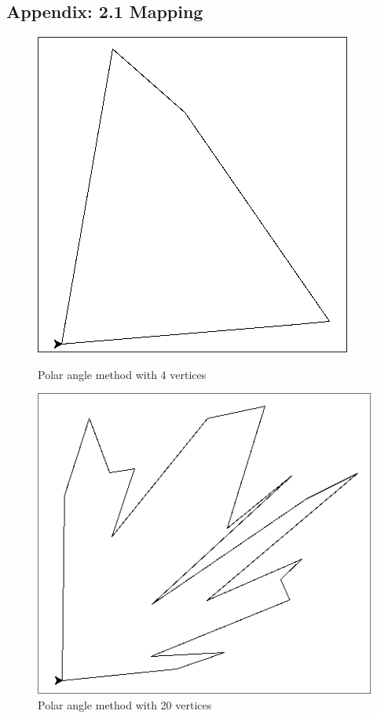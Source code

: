 \documentclass[progress]{cmpreport}
\begin{document}
\newpage
\begin{appendix}
	\section{Appendix: 2.1 Mapping}

	\begin{figure}[H]
		\centering
		\begin{minipage}[b]{0.45\textwidth}
			\centering
			\includegraphics[width=\textwidth]{images/FirstMappingSmall.jpg}
			\caption{Polar angle method with 4 vertices}
		\end{minipage}
		\hfill
		\begin{minipage}[b]{0.45\textwidth}
			\centering
			\includegraphics[width=\textwidth]{images/FirstMappingLarge.jpg}
			\caption{Polar angle method with 20 vertices}
		\end{minipage}
		\vspace{1em}


\end{figure}
\end{appendix}
\end{document}
